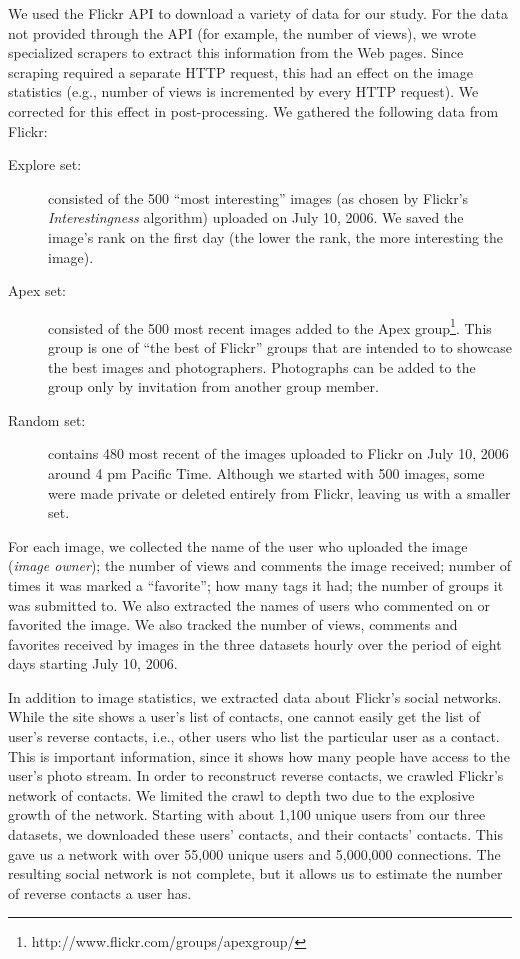 \documentclass[]{article}
\newcommand{\source}[1]{\textsf{#1}}
\begin{document}
We used the Flickr API to download a variety of data for our study.
For the data not provided through the API (for example, the number
of views), we wrote specialized scrapers to extract this
information from the Web pages. Since scraping required a separate
HTTP request, this had an effect on the image statistics (e.g.,
number of views is incremented by every HTTP request). We corrected
for this effect in post-processing. We gathered the following data from Flickr:
\begin{description}

\item[Explore set:] consisted of the 500 ``most
interesting'' images (as chosen by Flickr's \emph{Interestingness}
algorithm) uploaded on July 10, 2006. We saved the image's rank on
the first day (the lower the rank, the more interesting the image).


\item[Apex set:] consisted of the 500 most recent images added to the
\source{Apex}
group\footnote{http://www.flickr.com/groups/apexgroup/}. This group
is one of ``the best of Flickr'' groups that are intended to to
showcase the best images and photographers.
Photographs can be added to the group only by invitation from
another group member.

\item[Random set:] contains 480 most recent of the images
uploaded to Flickr on July 10, 2006 around 4 pm Pacific Time.
Although we started with 500 images, some were made private or
deleted entirely from Flickr, leaving us with a smaller set.

\end{description}

For each image, we collected the name of the user who uploaded the
image (\emph{image owner}); the number of views and comments the image received; number of
times it was marked a ``favorite''; how many tags it had; the number
of groups it was submitted to. We also extracted the names of users
who commented on or favorited the image. We also tracked the number of
views, comments and favorites received by images in the three
datasets hourly over the period of
eight days starting July 10, 2006.

In addition to image statistics, we extracted data about Flickr's
social networks. While the site shows a user's list of contacts, one
cannot easily get the list of user's reverse contacts, i.e., other
users who list the particular user as a contact. This is important
information, since it shows how many people have access to the
user's photo stream. In order to reconstruct reverse contacts, we
crawled Flickr's network of contacts. We limited the crawl to depth
two due to the explosive growth of the network. Starting with about
1,100 unique users from our three datasets, we downloaded these
users' contacts, and their contacts' contacts. This gave us a
network with over 55,000 unique users and 5,000,000 connections. The
resulting social network is not complete, but it allows us to
estimate the number of reverse contacts a user has.
\end{document}
